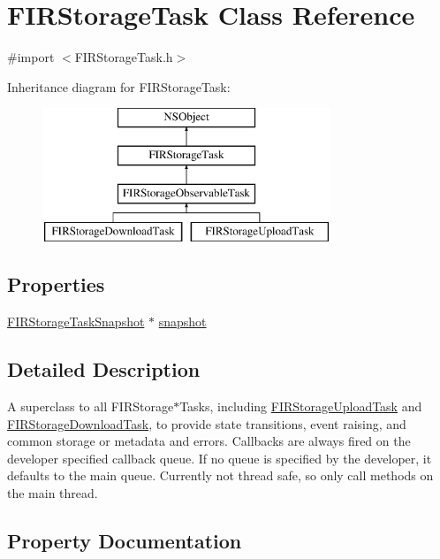 \hypertarget{interface_f_i_r_storage_task}{}\section{F\+I\+R\+Storage\+Task Class Reference}
\label{interface_f_i_r_storage_task}


{\ttfamily \#import $<$F\+I\+R\+Storage\+Task.\+h$>$}

Inheritance diagram for F\+I\+R\+Storage\+Task\+:\begin{figure}[H]
\begin{center}
\leavevmode
\includegraphics[height=4.000000cm]{interface_f_i_r_storage_task}
\end{center}
\end{figure}
\subsection*{Properties}
\begin{DoxyCompactItemize}
\item 
\hyperlink{interface_f_i_r_storage_task_snapshot}{F\+I\+R\+Storage\+Task\+Snapshot} $\ast$ \hyperlink{interface_f_i_r_storage_task_a43e00623001ff84760f98fd4f79eb9ac}{snapshot}
\end{DoxyCompactItemize}


\subsection{Detailed Description}
A superclass to all F\+I\+R\+Storage$\ast$\+Tasks, including \hyperlink{interface_f_i_r_storage_upload_task}{F\+I\+R\+Storage\+Upload\+Task} and \hyperlink{interface_f_i_r_storage_download_task}{F\+I\+R\+Storage\+Download\+Task}, to provide state transitions, event raising, and common storage or metadata and errors. Callbacks are always fired on the developer specified callback queue. If no queue is specified by the developer, it defaults to the main queue. Currently not thread safe, so only call methods on the main thread. 

\subsection{Property Documentation}
\hypertarget{interface_f_i_r_storage_task_a43e00623001ff84760f98fd4f79eb9ac}{}

